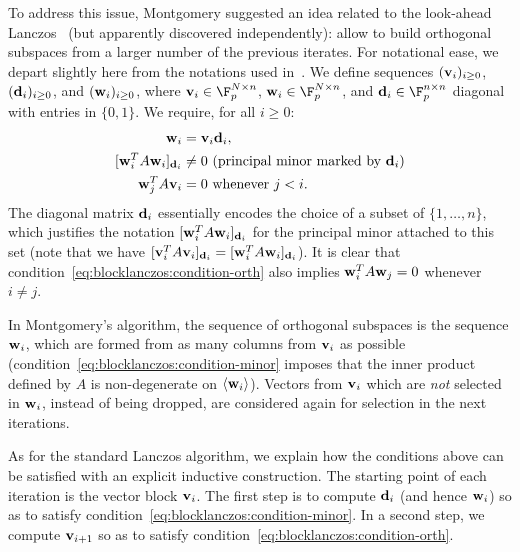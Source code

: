 To address this issue, Montgomery suggested an idea related to 
the look-ahead Lanczos~\cite{PaTaLi85} (but apparently discovered
independently): allow to build orthogonal subspaces
from a larger number of the previous iterates.
For notational
ease, we depart slightly here from the notations used
in~\cite{EC:Montgomery95}.
We define sequences $(\mathbf{v}_i)_{i\geq0}$, $(\mathbf{d}_i)_{i\geq0}$, and
$(\mathbf{w}_i)_{i\geq0}$, where $\bfv_i\in\F_p^{N\times n}$,
$\bfw_i\in\F_p^{N\times n}$, and $\bfd_i\in\F_p^{n\times n}$
diagonal with entries in $\{0,1\}$.
We require, for all $i\geq0$:
\begin{align}
    \notag \mathbf{w}_i&=\mathbf{v}_i\mathbf{d}_i,\\
\label{eq:blocklanczos:condition-minor}
[\mathbf{w}_i^TA\mathbf{w}_i]_{\mathbf{d}_i}&\not=0\text{ (principal minor
marked by $\mathbf{d}_i$)}\\
\label{eq:blocklanczos:condition-orth}
\mathbf{w}_j^TA\mathbf{v}_i&=0\text{ whenever $j<i$}.
\end{align}
The diagonal matrix
$\mathbf{d}_i$ essentially encodes the choice of a subset of
$\{1,\ldots,n\}$, which justifies the notation
$[\mathbf{w}_i^TA\mathbf{w}_i]_{\mathbf{d}_i}$ for the principal minor
attached to this set
(note that we have $[\mathbf{v}_i^TA\mathbf{v}_i]_{\mathbf{d}_i}=
[\mathbf{w}_i^TA\mathbf{w}_i]_{\mathbf{d}_i}$).
It is clear that
condition~\eqref{eq:blocklanczos:condition-orth} also implies
$\mathbf{w}_i^TA\mathbf{w}_j=0$ whenever $i\not=j$.

In Montgomery's algorithm, the sequence of orthogonal subspaces is the
sequence $\mathbf{w}_i$, which are formed from as many columns from $\mathbf{v}_i$ as
possible (condition~\ref{eq:blocklanczos:condition-minor} imposes that
the inner product defined by $A$ is non-degenerate on
$\langle\mathbf{w}_i\rangle$). Vectors from $\mathbf{v}_i$ which are \emph{not}
selected in $\mathbf{w}_i$, instead of being dropped, are considered again
for selection in the next iterations.


As for the standard Lanczos algorithm, we explain how the conditions
above can be satisfied with an explicit inductive construction. The
starting point of each iteration is the vector block $\mathbf{v}_i$. The first
step is to compute  $\mathbf{d}_i$ (and hence $\mathbf{w}_i$) so as to satisfy
condition~\eqref{eq:blocklanczos:condition-minor}.
In a second step, we
compute $\mathbf{v}_{i+1}$ so as to satisfy
condition~\eqref{eq:blocklanczos:condition-orth}.

